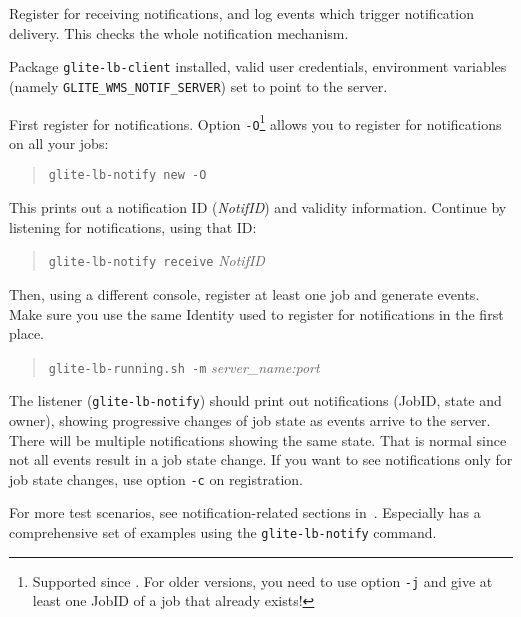 Register for receiving notifications, and log events which trigger
notification delivery. This checks the whole notification mechanism.

\req Package \texttt{glite-lb-client} installed, valid user credentials, environment variables (namely \texttt{GLITE\_WMS\_NOTIF\_SERVER}) set to point to the \LB server.

\how
First register for notifications. Option \texttt{-O}\footnote{Supported since . For older versions, you need to use option \texttt{-j} and give at least one JobID of a job that already exists!} allows you to register for notifications on all your jobs:
\begin{quote}
\texttt{glite-lb-notify new -O}
\end{quote}
This prints out a notification ID (\emph{NotifID}) and validity information. Continue by listening for notifications, using that ID:
\begin{quote}
\texttt{glite-lb-notify receive} \emph{NotifID}
\end{quote}
Then, using a different console, register at least one job and generate events. Make sure you use the same Identity used to register for notifications in the first place.
\begin{quote}
\texttt{glite-lb-running.sh -m} \emph{server\_name:port}
\end{quote}

\result
The listener (\texttt{glite-lb-notify}) should print out notifications (JobID, state and owner), showing progressive changes of job state as events arrive to the server. There will be multiple notifications showing the same state. That is normal since not all events result in a job state change. If you want to see notifications only for job state changes, use option \texttt{-c} on registration.

For more test scenarios, see notification-related sections in~\cite{lbug,lbtp}. Especially \cite{lbug} has a comprehensive set of examples using the \texttt{glite-lb-notify} command.
